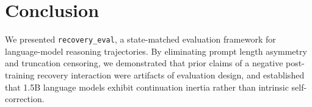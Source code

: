 \documentclass[10pt,conference]{IEEEtran}
\begin{document}
\section{Conclusion}
We presented \texttt{recovery\_eval}, a state-matched evaluation framework for language-model reasoning trajectories. By eliminating prompt length asymmetry and truncation censoring, we demonstrated that prior claims of a negative post-training recovery interaction were artifacts of evaluation design, and established that 1.5B language models exhibit continuation inertia rather than intrinsic self-correction.



\end{document}
